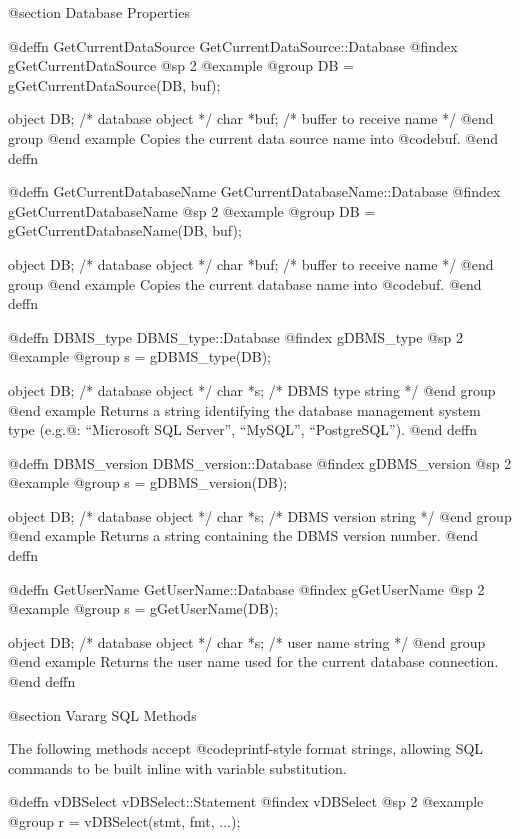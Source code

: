 @section Database Properties


@deffn {GetCurrentDataSource} GetCurrentDataSource::Database
@findex gGetCurrentDataSource
@sp 2
@example
@group
DB = gGetCurrentDataSource(DB, buf);

object  DB;    /*  database object             */
char    *buf;  /*  buffer to receive name      */
@end group
@end example
Copies the current data source name into @code{buf}.
@end deffn



@deffn {GetCurrentDatabaseName} GetCurrentDatabaseName::Database
@findex gGetCurrentDatabaseName
@sp 2
@example
@group
DB = gGetCurrentDatabaseName(DB, buf);

object  DB;    /*  database object              */
char    *buf;  /*  buffer to receive name       */
@end group
@end example
Copies the current database name into @code{buf}.
@end deffn



@deffn {DBMS_type} DBMS_type::Database
@findex gDBMS_type
@sp 2
@example
@group
s = gDBMS_type(DB);

object  DB;   /*  database object       */
char    *s;   /*  DBMS type string      */
@end group
@end example
Returns a string identifying the database management system type
(e.g.@: ``Microsoft SQL Server'', ``MySQL'', ``PostgreSQL'').
@end deffn



@deffn {DBMS_version} DBMS_version::Database
@findex gDBMS_version
@sp 2
@example
@group
s = gDBMS_version(DB);

object  DB;   /*  database object          */
char    *s;   /*  DBMS version string      */
@end group
@end example
Returns a string containing the DBMS version number.
@end deffn



@deffn {GetUserName} GetUserName::Database
@findex gGetUserName
@sp 2
@example
@group
s = gGetUserName(DB);

object  DB;   /*  database object     */
char    *s;   /*  user name string    */
@end group
@end example
Returns the user name used for the current database connection.
@end deffn



@section Vararg SQL Methods

The following methods accept @code{printf}-style format strings,
allowing SQL commands to be built inline with variable substitution.


@deffn {vDBSelect} vDBSelect::Statement
@findex vDBSelect
@sp 2
@example
@group
r = vDBSelect(stmt, fmt, ...);

